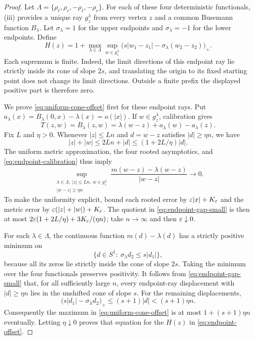 \begin{proof}
Let
$\Lambda=\{\rho_\ell,\rho_r,-\rho_\ell,-\rho_r\}$.
For each of these four deterministic functionals, (iii)
provides a unique ray $g^\lambda_z$ from every vertex $z$ and a common
Busemann function $B_\lambda$.  Let $\sigma_\lambda=1$ for the upper
endpoints and $\sigma_\lambda=-1$ for the lower endpoints.  Define
\begin{equation}\label{eq:endpoint-offset}
 H(z)=1+\max_{\lambda\in\Lambda}
 \sup_{w\in g^\lambda_z}
 \bigl(s|w_1-z_1|-\sigma_\lambda(w_2-z_2)\bigr)_+.
\end{equation}
Each supremum is finite.  Indeed, the limit directions of this endpoint
ray lie strictly inside its cone of slope $2s$, and translating the
origin to its fixed starting point does not change its limit directions.
Outside a finite prefix the displayed positive part is therefore zero.

We prove \eqref{eq:uniform-cone-offset} first for these endpoint rays.
Put $a_\lambda(x)=B_\lambda(0,x)-\lambda(x)=o(|x|)$.  If
$w\in g^\lambda_z$, calibration gives
\begin{equation}\label{eq:endpoint-calibration}
 T(z,w)=B_\lambda(z,w)
 =\lambda(w-z)+a_\lambda(w)-a_\lambda(z).
\end{equation}
Fix $L$ and $\eta>0$.  Whenever $|z|\leq Ln$ and $d=w-z$ satisfies
$|d|\geq\eta n$, we have
\[
 |z|+|w|\leq 2Ln+|d|
 \leq(1+2L/\eta)|d|.
\]
The uniform metric approximation, the four rooted asymptotics, and
\eqref{eq:endpoint-calibration} thus imply
\begin{equation}\label{eq:endpoint-gap-small}
 \sup_{
 \substack{\lambda\in\Lambda,\ |z|\leq Ln,\ w\in g^\lambda_z\\
                 |w-z|\geq\eta n}}
 \frac{m(w-z)-\lambda(w-z)}{|w-z|}\longrightarrow0.
\end{equation}
To make the uniformity explicit, bound each rooted error by
$\varepsilon|x|+K_\varepsilon$ and the metric error by
$\varepsilon(|z|+|w|)+K_\varepsilon$.  The quotient in
\eqref{eq:endpoint-gap-small} is then at most
$2\varepsilon(1+2L/\eta)+3K_\varepsilon/(\eta n)$; take $n\to\infty$ and then
$\varepsilon\downarrow0$.

For each $\lambda\in\Lambda$, the continuous function
$m(d)-\lambda(d)$ has a strictly positive minimum on
\[
 \{d\in S^1:\ \sigma_\lambda d_2\leq s|d_1|\},
\]
because all its zeros lie strictly inside the cone of slope $2s$.
Taking the minimum over the four functionals preserves positivity.
It follows from \eqref{eq:endpoint-gap-small} that, for all sufficiently
large $n$, every endpoint-ray displacement with $|d|\geq\eta n$ lies
in the unshifted cone of slope $s$.  For the remaining displacements,
\[
 \bigl(s|d_1|-\sigma_\lambda d_2\bigr)_+
 \leq(s+1)|d|<(s+1)\eta n.
\]
Consequently the maximum in \eqref{eq:uniform-cone-offset} is at most
$1+(s+1)\eta n$ eventually.  Letting $\eta\downarrow0$ proves that
equation for the $H(z)$ in \eqref{eq:endpoint-offset}.


\end{proof}
